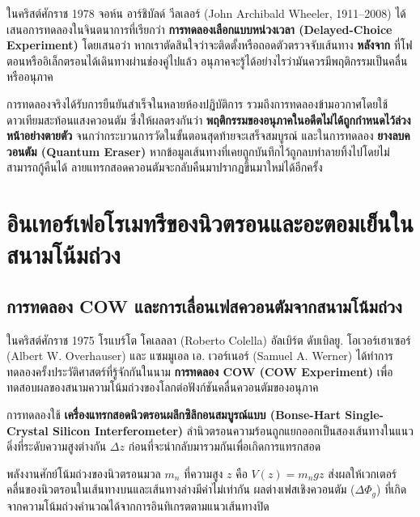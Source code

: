 ในคริสต์ศักราช 1978 จอห์น อาร์ชิบัลด์ วีลเลอร์ (John Archibald Wheeler, 1911--2008) ได้เสนอการทดลองในจินตนาการที่เรียกว่า \textbf{การทดลองเลือกแบบหน่วงเวลา (Delayed-Choice Experiment)} โดยเสนอว่า หากเราตัดสินใจว่าจะติดตั้งหรือถอดตัวตรวจจับเส้นทาง \textbf{หลังจาก} ที่โฟตอนหรืออิเล็กตรอนได้เดินทางผ่านช่องคู่ไปแล้ว อนุภาคจะรู้ได้อย่างไรว่ามันควรมีพฤติกรรมเป็นคลื่นหรืออนุภาค

การทดลองจริงได้รับการยืนยันสำเร็จในหลายห้องปฏิบัติการ รวมถึงการทดลองข้ามอวกาศโดยใช้ดาวเทียมสะท้อนแสงควอนตัม ซึ่งให้ผลตรงกันว่า \textbf{พฤติกรรมของอนุภาคในอดีตไม่ได้ถูกกำหนดไว้ล่วงหน้าอย่างตายตัว} จนกว่ากระบวนการวัดในขั้นตอนสุดท้ายจะเสร็จสมบูรณ์ และในการทดลอง \textbf{ยางลบควอนตัม (Quantum Eraser)} หากข้อมูลเส้นทางที่เคยถูกบันทึกไว้ถูกลบทำลายทิ้งไปโดยไม่สามารถกู้คืนได้ ลายแทรกสอดควอนตัมจะกลับคืนมาปรากฏขึ้นมาใหม่ได้อีกครั้ง

\section{อินเทอร์เฟอโรเมทรีของนิวตรอนและอะตอมเย็นในสนามโน้มถ่วง}

\subsection{การทดลอง COW และการเลื่อนเฟสควอนตัมจากสนามโน้มถ่วง}

ในคริสต์ศักราช 1975 โรแบร์โต โคเลลลา (Roberto Colella) อัลเบิร์ต ดับเบิลยู. โอเวอร์เฮาเซอร์ (Albert W. Overhauser) และ แซมมูเอล เอ. เวอร์เนอร์ (Samuel A. Werner) ได้ทำการทดลองครั้งประวัติศาสตร์ที่รู้จักกันในนาม \textbf{การทดลอง COW (COW Experiment)} เพื่อทดสอบผลของสนามความโน้มถ่วงของโลกต่อฟังก์ชันคลื่นควอนตัมของอนุภาค

การทดลองใช้ \textbf{เครื่องแทรกสอดนิวตรอนผลึกซิลิกอนสมบูรณ์แบบ (Bonse-Hart Single-Crystal Silicon Interferometer)} ลำนิวตรอนความร้อนถูกแยกออกเป็นสองเส้นทางในแนวดิ่งที่ระดับความสูงต่างกัน $\Delta z$ ก่อนที่จะนำกลับมารวมกันเพื่อเกิดการแทรกสอด

พลังงานศักย์โน้มถ่วงของนิวตรอนมวล $m_n$ ที่ความสูง $z$ คือ $V(z) = m_n g z$ ส่งผลให้เวกเตอร์คลื่นของนิวตรอนในเส้นทางบนและเส้นทางล่างมีค่าไม่เท่ากัน ผลต่างเฟสเชิงควอนตัม ($\Delta\Phi_g$) ที่เกิดจากความโน้มถ่วงคำนวณได้จากการอินทิเกรตตามแนวเส้นทางปิด

